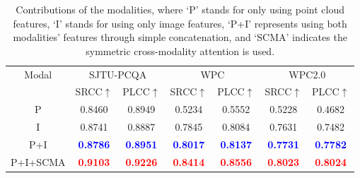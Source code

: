 \documentclass{article}
\begin{document}
\begin{table}[tb]\small
\renewcommand\tabcolsep{2.8pt}
    \centering
     
    \begin{tabular}{c|cc|cc|cc} 
    \toprule
    \multirow{2}{*}{Modal}  & \multicolumn{2}{c|}{SJTU-PCQA} & \multicolumn{2}{c|}{WPC} & \multicolumn{2}{c}{WPC2.0} \\ \cline{2-7}
            & SRCC$\uparrow$    & PLCC$\uparrow$   & SRCC$\uparrow$   & PLCC$\uparrow$ & SRCC$\uparrow$   & PLCC$\uparrow$ \\ \hline
        P         &0.8460 &0.8949 & 0.5234 & 0.5552 & 0.5228 & 0.4682\\
        I         &0.8741 &0.8887 & 0.7845 & 0.8084 & 0.7631 & 0.7482\\ 
        P+I       &\bf\textcolor{blue}{0.8786} &\bf\textcolor{blue}{0.8951} & \bf\textcolor{blue}{0.8017} & \bf\textcolor{blue}{0.8137} &\bf\textcolor{blue}{0.7731} & \bf\textcolor{blue}{0.7782} \\
        P+I+SCMA   & \bf\textcolor{red}{0.9103}   & \bf\textcolor{red}{0.9226}    &\bf\textcolor{red}{0.8414}    & \bf\textcolor{red}{0.8556}     &\bf\textcolor{red}{0.8023}    & \bf\textcolor{red}{0.8024}     \\     
    \bottomrule
    \end{tabular}
   \caption{Contributions of the modalities, where `P' stands for only using point cloud features, `I' stands for using only image features, `P+I' represents using both modalities' features through simple concatenation, and `SCMA' indicates the symmetric cross-modality attention is used. }
    \label{tab:modality}
    \vspace{-0.2cm}
\end{table}
\end{document}
